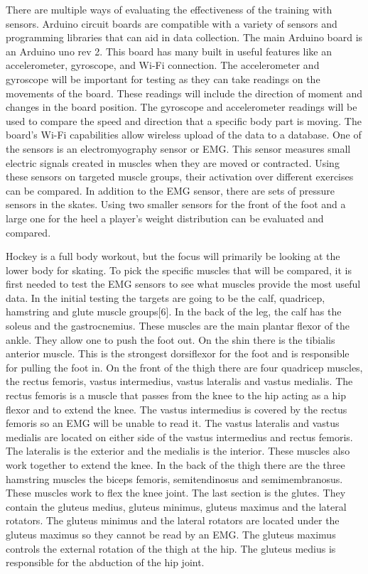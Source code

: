 There are multiple ways of evaluating the effectiveness of the training with sensors. Arduino circuit boards are compatible with a variety of sensors and programming libraries that can aid in data collection. The main Arduino board is an Arduino uno rev 2. This board has many built in useful features like an accelerometer, gyroscope, and Wi-Fi connection\cite{3}. The accelerometer and gyroscope will be important for testing as they can take readings on the movements of the board. These  readings will include the direction of moment and changes in the board position. The gyroscope and accelerometer readings will be used to compare the speed and direction that a specific body part is moving. The board's Wi-Fi capabilities allow wireless upload of the data to a database. One of the sensors is an electromyography sensor or EMG. This sensor measures small electric signals created in muscles when they are moved or contracted\cite{5}. Using these sensors on targeted muscle groups, their activation over different exercises can be compared.  In addition to the EMG sensor, there are sets of pressure sensors in the skates.  Using two smaller sensors for the front of the foot and a large one for the heel a player's weight distribution can be evaluated and compared.\par
Hockey is a full body workout, but the focus will primarily be looking at the lower body for skating. To pick the specific muscles that will be compared, it is first needed to test the EMG sensors to see what muscles provide the most useful data. In the initial testing the targets are going to be the calf, quadricep, hamstring and glute muscle groups[6]. In the back of the leg, the calf has the soleus and the gastrocnemius. These muscles are the main plantar flexor of the ankle. They allow one to push the foot out. On the shin there is the tibialis anterior muscle. This is the strongest dorsiflexor for the foot and is responsible for pulling the foot in. On the front of the thigh there are four quadricep muscles, the rectus femoris, vastus intermedius, vastus lateralis and vastus medialis. The rectus femoris is a muscle that passes from the knee to the hip acting as a hip flexor and to extend the knee. The vastus intermedius is covered by the rectus femoris so an EMG will be unable to read it.  The vastus lateralis and vastus medialis are located on either side of the vastus intermedius and rectus femoris. The lateralis is the exterior and the medialis is the interior. These muscles also work together to extend the knee. In the back of the thigh there are the three hamstring muscles the biceps femoris, semitendinosus and semimembranosus. These muscles work to flex the knee joint. The last section is the glutes. They contain the gluteus medius, gluteus minimus, gluteus maximus and the lateral rotators. The gluteus minimus and the lateral rotators are located under the gluteus maximus so they cannot be read by an EMG. The gluteus maximus controls the external rotation of the thigh at the hip. The gluteus medius is responsible for the abduction of the hip joint.\cite{7} 
